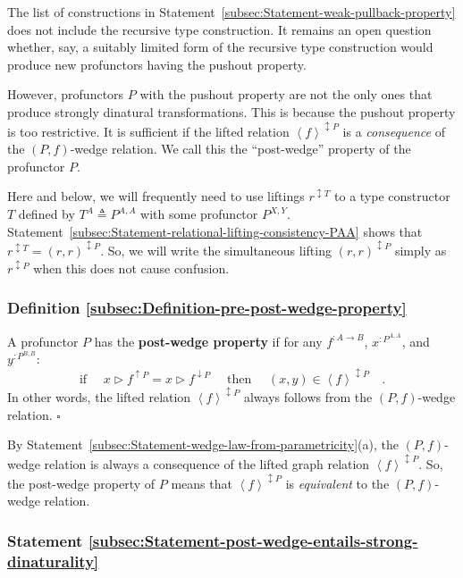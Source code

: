 The list of constructions in Statement~\ref{subsec:Statement-weak-pullback-property}
does not include the recursive type construction. It remains an open
question whether, say, a suitably limited form of the recursive type
construction would produce new profunctors having the pushout property.

However, profunctors $P$ with the pushout property are not the only
ones that produce strongly dinatural transformations. This is because
the pushout property is too restrictive. It is sufficient if the lifted
relation $\left<f\right>^{\updownarrow P}$ is a \emph{consequence}
of the $\left(P,f\right)$-wedge relation. We call this the \textsf{``}post-wedge\textsf{''}
property of the profunctor
$P$.

Here and below, we will frequently need to use liftings $r^{\updownarrow T}$
to a type constructor $T$ defined by $T^{A}\triangleq P^{A,A}$ with
some profunctor $P^{X,Y}$. Statement~\ref{subsec:Statement-relational-lifting-consistency-PAA}
shows that $r^{\updownarrow T}=(r,r)^{\updownarrow P}$. So, we will
write the simultaneous lifting $(r,r)^{\updownarrow P}$ simply as
$r^{\updownarrow P}$ when this does not cause confusion.

\subsubsection{Definition \label{subsec:Definition-pre-post-wedge-property}\ref{subsec:Definition-pre-post-wedge-property}}

A profunctor $P$ has the \textbf{post-wedge property} if for any
$f^{:A\rightarrow B}$, $x^{:P^{A,A}}$, and $y^{:P^{B,B}}$:
\[
\text{if }\quad x\triangleright f^{\uparrow P}=x\triangleright f^{\downarrow P}\quad\text{ then }\quad(x,y)\in\left<f\right>^{\updownarrow P}\quad.
\]
In other words, the lifted relation $\left<f\right>^{\updownarrow P}$
always follows from the $\left(P,f\right)$-wedge relation. $\square$

By Statement~\ref{subsec:Statement-wedge-law-from-parametricity}(a),
the $\left(P,f\right)$-wedge relation is always a consequence of
the lifted graph relation $\left<f\right>^{\updownarrow P}$. So,
the post-wedge property of $P$ means that $\left<f\right>^{\updownarrow P}$
is \emph{equivalent} to the $\left(P,f\right)$-wedge relation.

\subsubsection{Statement \label{subsec:Statement-post-wedge-entails-strong-dinaturality}\ref{subsec:Statement-post-wedge-entails-strong-dinaturality}}

